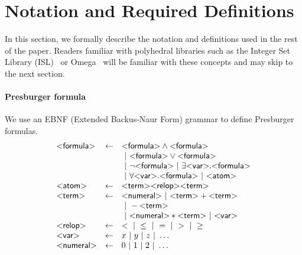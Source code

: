 
\section{Notation and Required Definitions}

In this section, we formally describe the notation and definitions 
used in the rest of the paper.  Readers
familiar with polyhedral libraries such as the Integer Set Library
(ISL)~\cite{verdoolaege_isl:_2010} or Omega~\cite{omega} will be familiar with these
concepts and may skip to the next section.


\paragraph{Presburger formula}

We use an EBNF (Extended Backus-Naur Form) grammar to define Presburger formulas.
\[
\begin{array}{lcl}
\text{\sf\textless formula\textgreater} & \gets &  \text{\sf\textless formula\textgreater} \wedge \text{\sf\textless formula\textgreater} \\ 
        & & ~|~ \text{\sf\textless formula\textgreater} \vee   \text{\sf\textless formula\textgreater} \\
        & & ~|~ \neg \text{\sf\textless formula\textgreater} 
        ~|~ \exists \text{\sf\textless var\textgreater}. \text{\sf\textless formula\textgreater} \\
        & & ~|~ \forall \text{\sf\textless var\textgreater}. \text{\sf\textless formula\textgreater}
        ~|~ \text{\sf\textless atom\textgreater} \\
                            
\text{\sf\textless atom\textgreater} & \gets &  \text{\sf\textless term\textgreater} \text{\sf\textless relop\textgreater} \text{\sf\textless term\textgreater}
                            \\
\text{\sf\textless term\textgreater} & \gets &     \text{\sf\textless numeral\textgreater}
        ~|~ \text{\sf\textless term\textgreater} + \text{\sf\textless term\textgreater} \\
        & & ~|~ -\text{\sf\textless term\textgreater} \\
        & & ~|~ \text{\sf\textless numeral\textgreater} * \text{\sf\textless term\textgreater}
        ~|~ \text{\sf\textless var\textgreater}
                            \\
\text{\sf\textless relop\textgreater} & \gets &    <
        ~|~ \leq
                            ~|~ =
                            ~|~ >
                            ~|~ \geq
                            \\
\text{\sf\textless var\textgreater} & \gets &      x
                            ~|~ y
                            ~|~ z
                            ~|~ \dots
                            \\
\text{\sf\textless numeral\textgreater} & \gets &  0
                            ~|~ 1
                            ~|~ 2
                            ~|~ \dots
                            \\
\end{array}
\]

